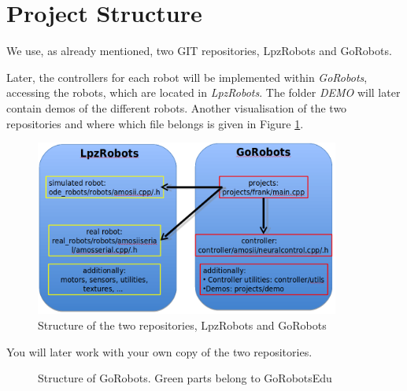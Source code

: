 \section{Project Structure}

We use, as already mentioned, two GIT repositories, LpzRobots and GoRobots.

Later, the controllers for each robot will be implemented within \emph{GoRobots}, accessing the robots, which are located in \emph{LpzRobots}. The folder \emph{DEMO} will later contain demos of the different robots.
Another visualisation of the two repositories and where which file belongs is given in Figure \ref{struc2}.
\begin{figure}[h!]
 \begin{center}
  \includegraphics[width=10cm]{./pics/struct.png}
 \end{center}
\caption{Structure of the two repositories, LpzRobots and GoRobots}
\label{struc2}
\end{figure}

You will later work with your own copy of the two repositories.

\newpage


\begin{figure}[h!]
 \begin{center}
 \end{center}
\caption{Structure of GoRobots. Green parts belong to GoRobotsEdu}
\label{struc3}
\end{figure}
